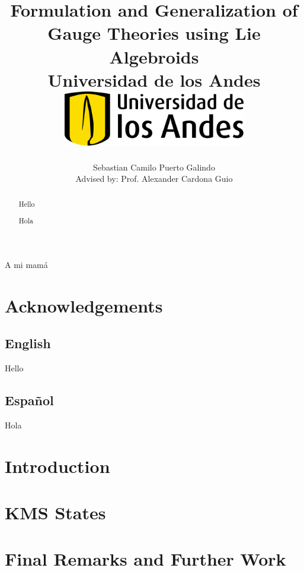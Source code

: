 \documentclass[12pt]{report}
\title 
{
	{Formulation and Generalization of Gauge Theories using Lie Algebroids}\\
	{\large Universidad de los Andes}\\
	\vspace{1.5cm}
	{\includegraphics[width = 0.6\textwidth]{logo.png}}	
}
\author{Sebastian Camilo Puerto Galindo\\[1cm]{\small Advised by: Prof. Alexander Cardona Guio}}
\newenvironment{dedication}
  {\clearpage           %
   \thispagestyle{empty}%
   \vspace*{\stretch{1}}%
   \raggedleft          %
  }
  {\par %
   \vspace{\stretch{3}} %
   \clearpage           %
  }
\theoremstyle{definition}
\begin{document}

\maketitle

\begin{dedication}
{\LARGE\calligra A mi mamá}
\end{dedication}

\begin{abstract}
Hello
\end{abstract}

\begin{otherlanguage}{spanish}
\begin{abstract}
Hola
\end{abstract}
\end{otherlanguage}

\newpage

\chapter*{Acknowledgements}

\section*{English}
Hello
\begin{otherlanguage}{spanish}
\section*{Español}
Hola
\end{otherlanguage}

\tableofcontents

\chapter{Introduction}


\chapter{KMS States}\label{chp:KMS}


\chapter{Final Remarks and Further Work}


\printbibliography
\end{document}
